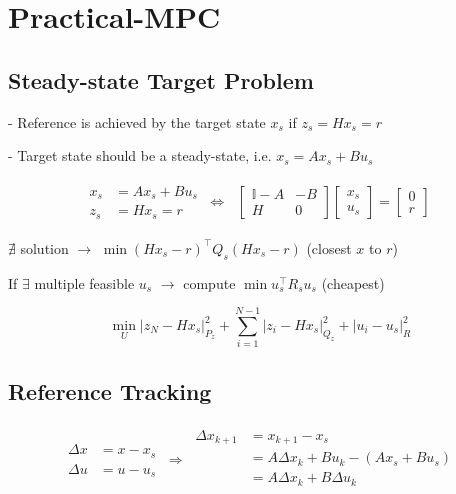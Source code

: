 \section{Practical-MPC}

\subsection{Steady-state Target Problem}


- Reference is achieved by the target
state $x_s$ if $z_s = Hx_s = r$


- Target state should be a steady-state,
i.e. $x_s = Ax_s + Bu_s$


\begin{align*}
	\begin{aligned}
		x_s & = Ax_s + Bu_s \\
		z_s & = Hx_s = r
	\end{aligned}
	\ \Longleftrightarrow \
	\begin{aligned}
		\begin{bmatrix}
			\mathbb{I} - A & -B \\
			H              & 0
		\end{bmatrix}
		\begin{bmatrix}
			x_s \\
			u_s
		\end{bmatrix}
		=
		\begin{bmatrix}
			0 \\
			r
		\end{bmatrix}
	\end{aligned}
\end{align*}

$\nexists$ solution
$\rightarrow$
$\min (Hx_s - r)^\top Q_s (H x_s - r)$
(closest $x$ to $r$)

If $\exists$ multiple feasible $u_s$
$\rightarrow$
compute
$\min u_s^\top R_s u_s$
(cheapest)

$$
	\min_U |z_N - Hx_s|_{P_z}^2
	+ \sum_{i=1}^{N-1} | z_i - Hx_s |_{Q_z}^2
	+ | u_i - u_s |_{R}^2
$$

\subsection{Reference Tracking}

\begin{align*}
	\begin{aligned}
		\Delta x & = x - x_s
		\\
		\Delta u & = u - u_s
	\end{aligned}
	\ \Rightarrow \
	\begin{aligned}
		\Delta x_{k+1}
		 & = x_{k+1} -x_s                          \\
		 & = A\Delta x_k + B u_k - (A x_s + B u_s) \\
		 & = A\Delta x_k + B\Delta u_k             \\
	\end{aligned}
\end{align*}

